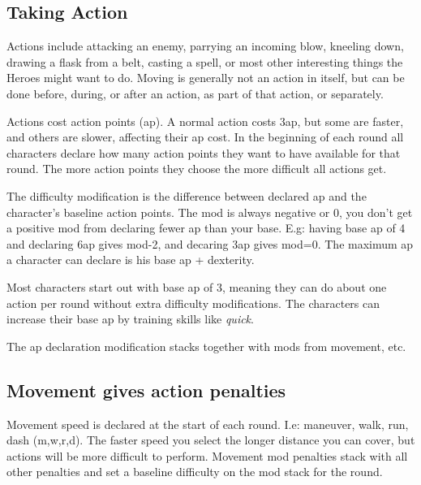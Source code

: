 

\subsection*{Taking Action}
Actions include attacking an enemy, parrying an incoming blow, kneeling down, drawing a flask from a belt, casting a spell, or most other interesting things the Heroes might want to do. Moving is generally not an action in itself, but can be done before, during, or after an action, as part of that action, or separately.

Actions cost action points (ap). A normal action costs 3ap, but some are faster, and others are slower, affecting their ap cost. In the beginning of each round all characters declare how many action points they want to have available for that round. The more action points they choose the more difficult all actions get.

The difficulty modification is the difference between declared ap and the character's baseline action points. The mod is always negative or 0, you don't get a positive mod from declaring fewer ap than your base. E.g: having base ap of 4 and declaring 6ap gives mod-2, and decaring 3ap gives mod=0. The maximum ap a character can declare is his base ap + dexterity.

Most characters start out with base ap of 3, meaning they can do about one action per round without extra difficulty modifications. The characters can increase their base ap by training skills like \emph{quick}.

The ap declaration modification stacks together with mods from movement, etc.


\subsection*{Movement gives action penalties}
Movement speed is declared at the start of each round. I.e: maneuver, walk, run, dash (m,w,r,d). The faster speed you select the longer distance you can cover, but actions will be more difficult to perform. Movement mod penalties stack with all other penalties and set a baseline difficulty on the mod stack for the round.

\

